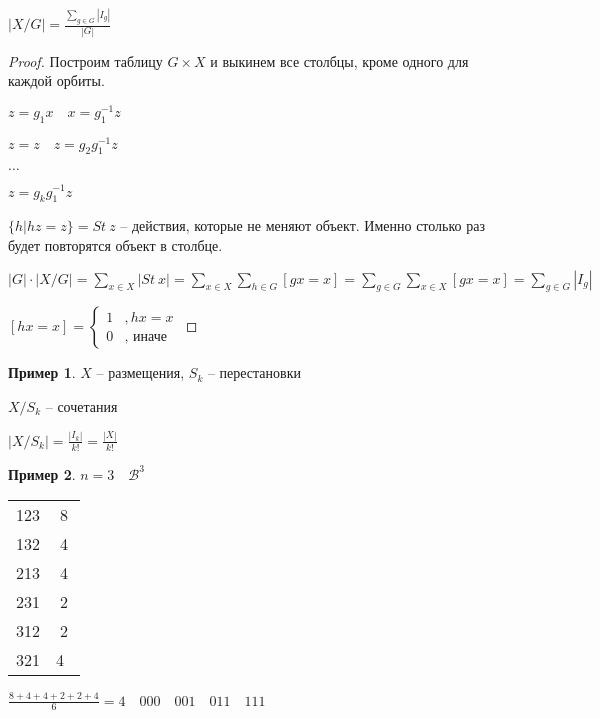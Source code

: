 \documentclass{book}
\theoremstyle{definition}
\newtheorem*{example}{Пример}
\newcommand{\incfig}[1]{%
    \def\svgwidth{\columnwidth}
    {#1.pdf_tex}
}
\begin{document}
\begin{theorem}
    $\left| X / G \right|  = \frac{\sum_{g\in G} \left| I_g \right| }{|G|}$
\end{theorem}
\begin{proof}

Построим таблицу $G\times X$ и выкинем все столбцы, кроме одного для каждой орбиты. 

$z=g_1x\quad x=g_1^{-1}z$

$z = z\quad z=g_2g_1^{-1}z$

$\ldots$

$z = g_kg_1^{-1}z$

$\{h|hz=z\} = St~z$ -- действия, которые не меняют объект. Именно столько раз будет повторятся объект в столбце. 

$|G|\cdot \left| X / G \right|  = \sum_{x\in X} \left| St~x \right| = \sum_{x\in X}\sum_{h\in G}[gx=x] = \sum_{g\in G}\sum_{x\in X}[gx=x] = \sum_{g\in G}|I_g| $ 

$[hx=x] = \begin{cases}
    1&,hx=x\\
    0&, \text{ иначе}
\end{cases}$ 

\end{proof}

\begin{example}
    $X$ -- размещения,  $S_k$ -- перестановки

     $X / S_k$ -- сочетания

      $\left| X / S_k \right|  = \frac{|I_k|}{k!} = \frac{|X|}{k!}$
\end{example}

\begin{example}
    $n=3\quad \mathscr{B}^3$ 

    \begin{tabular}{c|c}
        123&8\\
        132&4\\
        213&4\\
        231&2\\
        312&2\\
        321&4\
        
    \end{tabular}

    $\frac{8+4+4+2+2+4}{6} = 4\quad 000\quad 001\quad 011\quad 111 $
\end{example}
\end{document}
